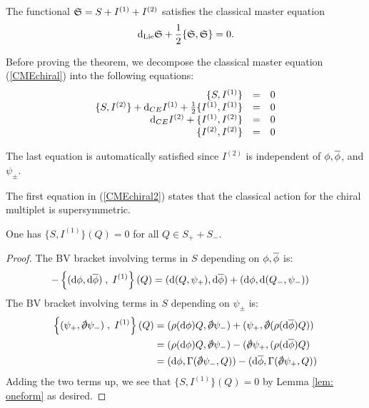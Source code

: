 \documentclass[10pt, oneside]{article}
\begin{document}
\begin{thm}
The functional $\fS = S + I^{(1)} + I^{(2)}$ satisfies the classical master equation
\begin{equation}\label{CMEchiral}
\d_{\rm Lie} \fS + \frac{1}{2} \{\fS, \fS\} = 0 .
\end{equation}
\end{thm}

Before proving the theorem, we decompose the classical master equation (\ref{CMEchiral}) into the following equations:
\begin{equation}\label{CMEchiral2}
\begin{array}{rrrrrr}
\{S , I^{(1)}\} & = & 0 \\ 
\{S, I^{(2)}\} + \d_{CE} I^{(1)} + \frac{1}{2} \{I^{(1)}, I^{(1)}\} & = & 0 \\
\d_{CE} I^{(2)} + \{I^{(1)}, I^{(2)}\} & =& 0 \\
\{I^{(2)}, I^{(2)}\} & =& 0
\end{array}
\end{equation}

The last equation is automatically satisfied since $I^{(2)}$ is independent of $\phi, \Bar{\phi}$, and $\psi_{\pm}$. 

The first equation in (\ref{CMEchiral2}) states that the classical action for the chiral multiplet is supersymmetric. 

\begin{lemma} 
One has $\{S, I^{(1)}\} (Q) = 0$ for all $Q \in S_+ + S_-$. 
\end{lemma}
\begin{proof}
The BV bracket involving terms in $S$ depending on $\phi,\Bar{\phi}$ is:
\begin{align*}
- \left\{(\d \phi, \d \Bar{\phi}) \; , \; I^{(1)} \right\}  (Q) & = (\d (Q, \psi_+), \d \Bar{\phi}) + (\d \phi, \d (Q_-, \psi_-))
\end{align*}
The BV bracket involving terms in $S$ depending on $\psi_\pm$ is:
\begin{align*}
\left\{ (\psi_+ , \sd \dd \psi_-) \; , \; I^{(1)} \right\} (Q) & = (\rho(\d \phi) Q, \sd \dd \psi_-) + (\psi_+, \sd \dd (\rho(\d \Bar{\phi}) Q)) \\ & =  (\rho(\d \phi) Q, \sd \dd \psi_-) - (\sd \dd \psi_+, (\rho(\d \Bar{\phi}) Q) \\ & =( \d \phi , \Gamma(\sd \dd \psi_-, Q)) - (\d \Bar{\phi} , \Gamma(\sd \dd \psi_+, Q))
\end{align*}
Adding the two terms up, we see that $\{S,I^{(1)}\}(Q) = 0$ by Lemma \ref{lem: oneform} as desired. 
\end{proof}
\end{document}
